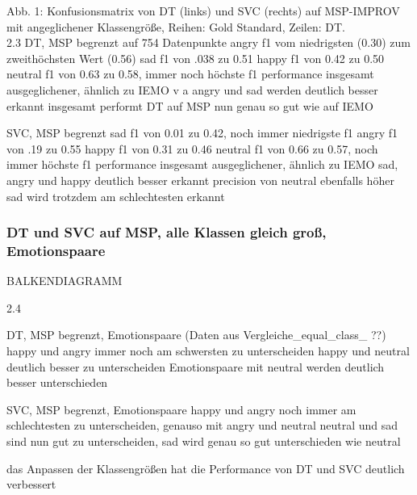 \documentclass{article} %
\begin{document}
Abb. 1: Konfusionsmatrix von DT (links) und SVC (rechts) auf MSP-IMPROV mit angeglichener Klassengröße, Reihen: Gold Standard, Zeilen: DT. \\

2.3
DT, MSP begrenzt auf 754 Datenpunkte
angry f1 vom niedrigsten (0.30) zum zweithöchsten Wert (0.56)
sad f1 von .038 zu 0.51
happy f1 von 0.42 zu 0.50
neutral f1 von 0.63 zu 0.58, immer noch höchste f1
performance insgesamt ausgeglichener, ähnlich zu IEMO
v a angry und sad werden deutlich besser erkannt
insgesamt performt DT auf MSP nun genau so gut wie auf IEMO

SVC, MSP begrenzt
sad f1 von 0.01 zu 0.42, noch immer niedrigste f1
angry f1 von .19 zu 0.55
happy f1 von 0.31 zu 0.46
neutral f1 von 0.66 zu 0.57, noch immer höchste f1
performance insgesamt ausgeglichener, ähnlich zu IEMO
sad, angry und happy deutlich besser erkannt
precision von neutral ebenfalls höher
sad wird trotzdem am schlechtesten erkannt

\subsubsection{DT und SVC auf MSP, alle Klassen gleich groß, Emotionspaare}

BALKENDIAGRAMM

2.4

DT, MSP begrenzt, Emotionspaare (Daten aus Vergleiche_equal_class_ ??)
happy und angry immer noch am schwersten zu unterscheiden
happy und neutral deutlich besser zu unterscheiden
Emotionspaare mit neutral werden deutlich besser unterschieden

SVC, MSP begrenzt, Emotionspaare
happy und angry noch immer am schlechtesten zu unterscheiden, genauso mit angry und neutral
neutral und sad sind nun gut zu unterscheiden, sad wird genau so gut unterschieden wie neutral

das Anpassen der Klassengrößen hat die Performance von DT und SVC deutlich verbessert
\end{document}
